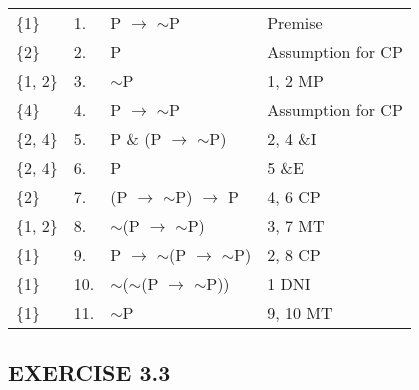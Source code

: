 \documentclass[a4paper,12pt]{article}
\newcommand{\ra}{$\rightarrow$ }
\newcommand{\s}{$\sim$}
\begin{document}
\begin{enumerate}[label=\arabic*,leftmargin=*]
\begin{enumerate}[label=\arabic*.]
\begin{minipage}{\textwidth}
                    \begin{tabular}{l l l l}
                        \{1\} & 1. & P \ra \s P & Premise\\
                        \{2\} & 2. & P & Assumption for CP\\
                        \{1, 2\} & 3. & \s P & 1, 2 MP\\
                        \{4\} & 4. & P \ra \s P & Assumption for CP\\
                        \{2, 4\} & 5. & P \& (P \ra \s P) & 2, 4 \&I\\
                        \{2, 4\} & 6. & P & 5 \&E\\
                        \{2\} & 7. & (P \ra \s P) \ra P & 4, 6 CP\\
                        \{1, 2\} & 8. & \s (P \ra \s P) & 3, 7 MT\\
                        \{1\} & 9. & P \ra \s (P \ra \s P) & 2, 8 CP\\
                        \{1\} & 10. & \s (\s (P \ra \s P)) & 1 DNI\\
                        \{1\} & 11. & \s P & 9, 10 MT\\
                    \end{tabular}
                \end{minipage}

            \end{enumerate}
    \end{enumerate}

    \subsection*{EXERCISE 3.3}
\end{document}
